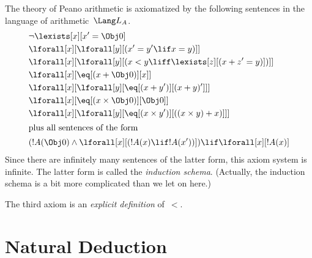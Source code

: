 \begin{ex}
The theory of Peano arithmetic is axiomatized by the following
sentences in the language of arithmetic~$\Lang L_A$.
\begin{align*}
& \lnot\lexists[x][x' = \Obj 0]\\
& \lforall[x][\lforall[y][(x' = y' \lif x = y)]]\\
& \lforall[x][\lforall[y][(x < y \liff \lexists[z][(x + z' = y)])]]\\
& \lforall[x][\eq[(x + \Obj 0)][x]]\\
& \lforall[x][\lforall[y][\eq[(x + y')][(x + y)']]]\\
& \lforall[x][\eq[(x \times \Obj 0)][\Obj 0]]\\
& \lforall[x][\lforall[y][\eq[(x \times y')][((x \times y) + x)]]]\\
\intertext{plus all sentences of the form}
& (!A(\Obj 0) \land \lforall[x][(!A(x) \lif !A(x'))]) \lif \lforall[x][!A(x)]
\end{align*}
Since there are infinitely many sentences of the latter form, this
axiom system is infinite.  The latter form is called the
\emph{induction schema}. (Actually, the induction schema is a bit more
complicated than we let on here.)

The third axiom is an \emph{explicit definition} of~$<$.
\end{ex}

\OLEndChapterHook

\chapter{Natural Deduction}






\OLEndChapterHook


\stopproblems
\def\ifproblems#1{}

\def\captionnamefont{\sffamily\color{leadbeater}}
\def\captiontitlefont{\sffamily\color{leadbeater}}

\def\figurename{Fig.}
\setlength{\olphotowidth}{.45\textwidth}

